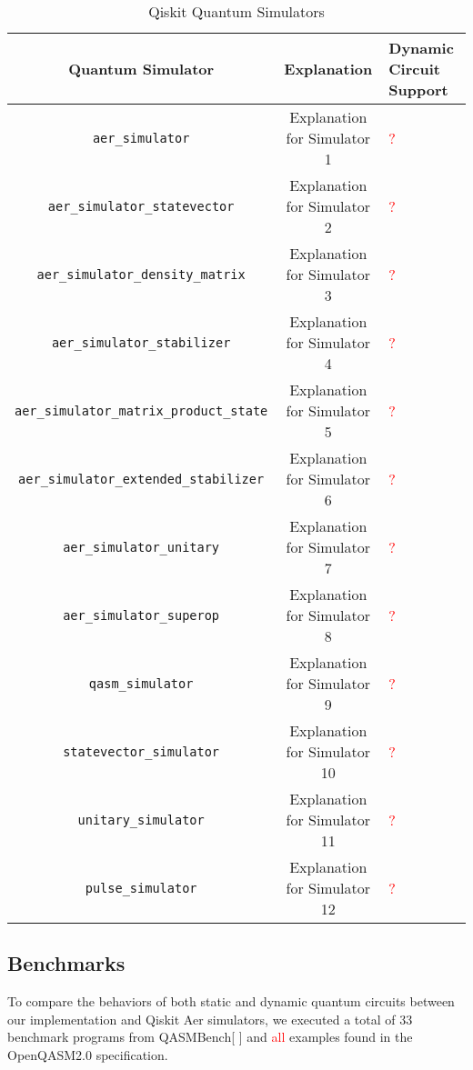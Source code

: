 \documentclass[10pt,a4paper]{article}
\newcommand{\<}{\langle}
\renewcommand{\>}{\rangle}
\newcommand{\red}[1]{\textcolor{red}{#1}}
\begin{document}
\begin{table}[h]
\centering
\begin{tabularx}{\textwidth}{|c|c|X|}
\hline
\textbf{Quantum Simulator} & \textbf{Explanation} & \textbf{Dynamic Circuit Support}\\
\hline
\texttt{aer\_simulator} & Explanation for Simulator 1 & \textcolor{red}{?} \\
\hline
\texttt{aer\_simulator\_statevector} & Explanation for Simulator 2 & \textcolor{red}{?} \\
\hline
\texttt{aer\_simulator\_density\_matrix} & Explanation for Simulator 3 & \textcolor{red}{?} \\
\hline
\texttt{aer\_simulator\_stabilizer} & Explanation for Simulator 4 & \textcolor{red}{?} \\
\hline
\texttt{aer\_simulator\_matrix\_product\_state} & Explanation for Simulator 5 & \textcolor{red}{?} \\
\hline
\texttt{aer\_simulator\_extended\_stabilizer}& Explanation for Simulator 6 & \textcolor{red}{?} \\
\hline
\texttt{aer\_simulator\_unitary} & Explanation for Simulator 7 & \textcolor{red}{?} \\
\hline
\texttt{aer\_simulator\_superop} & Explanation for Simulator 8 & \textcolor{red}{?} \\
\hline
\texttt{qasm\_simulator} & Explanation for Simulator 9 & \textcolor{red}{?} \\
\hline
\texttt{statevector\_simulator} & Explanation for Simulator 10 & \textcolor{red}{?} \\
\hline
\texttt{unitary\_simulator} & Explanation for Simulator 11 & \textcolor{red}{?} \\
\hline
\texttt{pulse\_simulator} & Explanation for Simulator 12 & \textcolor{red}{?} \\
\hline
\end{tabularx}
\caption{Qiskit Quantum Simulators}
\label{table:qsimulators}
\end{table}

\subsection{Benchmarks}

To compare the behaviors of both static and dynamic quantum circuits between our implementation and
Qiskit Aer simulators, we executed a total of 33 benchmark programs from QASMBench[ ] and \red{all} examples
found in the OpenQASM2.0 specification.
\end{document}
